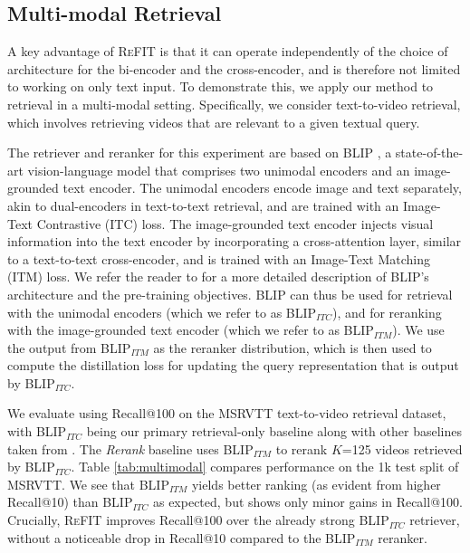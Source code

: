 \subsection{Multi-modal Retrieval}
\label{sec:multimodal_results}
A key advantage of \textsc{ReFIT} is that it can operate independently of the choice of architecture for the bi-encoder and the cross-encoder, and is therefore not limited to working on only text input.
To demonstrate this, we apply our method to retrieval in a multi-modal setting. Specifically, we consider text-to-video retrieval, which involves retrieving videos that are relevant to a given textual query. 

The retriever and reranker for this experiment are based on BLIP \cite{li2022blip}, a state-of-the-art vision-language model that comprises two unimodal encoders and an image-grounded text encoder. 
The unimodal encoders encode image and text separately, akin to dual-encoders in text-to-text retrieval, and are trained with an Image-Text Contrastive (ITC) loss. The image-grounded text encoder injects visual information into the text encoder by incorporating a cross-attention layer, similar to a text-to-text cross-encoder, and is trained with an Image-Text Matching (ITM) loss. We refer the reader to \cite{li2022blip} for a more detailed description of BLIP's architecture and the pre-training objectives. BLIP can thus be used for retrieval with the unimodal encoders (which we refer to as BLIP$_{ITC}$), and for reranking with the image-grounded text encoder (which we refer to as BLIP$_{ITM}$). We use the output from BLIP$_{ITM}$ as the reranker distribution, which is then used to compute the distillation loss for updating the query representation that is output by BLIP$_{ITC}$. 

We evaluate using Recall@100 on the MSRVTT \cite{xu2016msr} text-to-video retrieval dataset, with BLIP$_{ITC}$ \cite{li2022blip} being our primary retrieval-only baseline along with other baselines taken from \cite{li2022blip}.
The \textit{Rerank} baseline uses BLIP$_{ITM}$ to rerank $K$=125 videos retrieved by BLIP$_{ITC}$.
Table \ref{tab:multimodal} compares performance on the 1k test split of MSRVTT. We see that BLIP$_{ITM}$ yields better ranking (as evident from higher Recall@10) than BLIP$_{ITC}$ as expected, but shows only minor gains in Recall@100. Crucially, \textsc{ReFIT} improves Recall@100 over the already strong BLIP$_{ITC}$ retriever, without a noticeable drop in Recall@10 compared to the BLIP$_{ITM}$ reranker.

